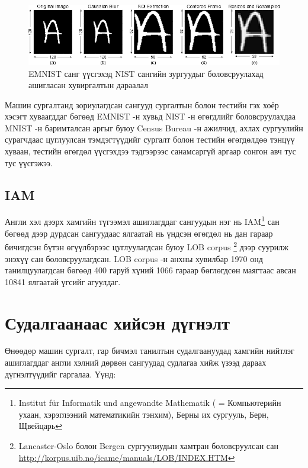 \begin{figure}[ht]
	\centering
	\includegraphics[width=1\linewidth]{images/emnist}
	\caption{EMNIST санг үүсгэхэд NIST сангийн зургуудыг боловсруулахад ашигласан хувиргалтын дараалал \cite{emnist}}
	\label{fig:emnist-conversion}
\end{figure}

Машин сургалтанд зориулагдсан сангууд сургалтын болон тестийн гэх хоёр хэсэгт хуваагддаг бөгөөд EMNIST -н хувьд NIST -н өгөгдлийг боловсруулахдаа MNIST -н баримталсан аргыг буюу Census Bureau -н ажилчид, ахлах сургуулийн сурагчдаас цуглуулсан тэмдэгтүүдийг сургалт болон тестийн өгөгдөлдөө тэнцүү хуваан, тестийн өгөгдөл үүсгэхдээ тэдгээрээс санамсаргүй аргаар сонгон авч тус тус үүсгэжээ.

\subsection{IAM \cite{iam-database}}

Англи хэл дээрх хамгийн түгээмэл ашиглагддаг сангуудын нэг нь IAM\footnote{Institut für Informatik und angewandte Mathematik ( = Компьютерийн ухаан, хэрэглээний математикийн тэнхим), Берны их сургууль, Берн, Щвейцарь} сан бөгөөд дээр дурдсан сангуудаас ялгаатай нь үндсэн өгөгдөл нь дан гараар бичигдсэн бүтэн өгүүлбэрээс цуглуулагдсан буюу LOB corpus \cite{lob-corpus}\footnote{Lancaster-Oslo болон Bergen сургуулиудын хамтран боловсруулсан сан \url{http://korpus.uib.no/icame/manuals/LOB/INDEX.HTM}} дээр суурилж энэхүү сан боловсруулагдсан. LOB corpus -н анхны хувилбар 1970 онд танилцуулагдсан бөгөөд 400 гаруй хүний 1066 гараар бөглөгдсөн маягтаас авсан 10841 ялгаатай үгсийг агуулдаг.

\section{Судалгаанаас хийсэн дүгнэлт}

Өнөөдөр машин сургалт, гар бичмэл танилтын судалгаануудад хамгийн нийтлэг ашиглагддаг англи хэлний дөрвөн сангуудад судлагаа хийж үзээд дараах дүгнэлтүүдийг гаргалаа. Үүнд:

